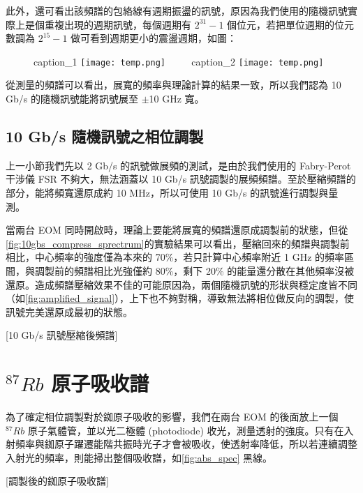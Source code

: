 \documentclass[class=NCU_thesis, crop=false]{standalone}
\begin{document}
此外，還可看出該頻譜的包絡線有週期振盪的訊號，原因為我們使用的隨機訊號實際上是個重複出現的週期訊號，每個週期有 $2^{31}-1$ 個位元，若把單位週期的位元數調為 $2^{15}-1$ 做可看到週期更小的震盪週期，如圖：

\begin{figure}[!hbt]
    \centering
    \subcaptionbox
        {caption\_1
        \label{fig:subfig_fig1}}
        {\texttt{[image: temp.png]}}
    ~~~~
    \subcaptionbox
        {caption\_2
        \label{fig:subfig_fig2}}
        {\texttt{[image: temp.png]}}
\end{figure}

從測量的頻譜可以看出，展寬的頻率與理論計算的結果一致，所以我們認為 10 Gb/s 的隨機訊號能將訊號展至 $\pm$10 GHz 寬。

\subsection{10 Gb/s 隨機訊號之相位調製}

上一小節我們先以 2 Gb/s 的訊號做展頻的測試，是由於我們使用的 Fabry-Perot 干涉儀 FSR 不夠大，無法涵蓋以 10 Gb/s 訊號調製的展頻頻譜。至於壓縮頻譜的部分，能將頻寬還原成約 10 MHz，所以可使用 10 Gb/s 的訊號進行調製與量測。

當兩台 EOM 同時開啟時，理論上要能將展寬的頻譜還原成調製前的狀態，但從\cref{fig:10gbs_compress_sprectrum}的實驗結果可以看出，壓縮回來的頻譜與調製前相比，中心頻率的強度僅為本來的 70\%，若只計算中心頻率附近 1 GHz 的頻率區間，與調製前的頻譜相比光強僅約 80\%，剩下 20\% 的能量還分散在其他頻率沒被還原。造成頻譜壓縮效果不佳的可能原因為，兩個隨機訊號的形狀與穩定度皆不同（如\cref{fig:amplified_signal}），上下也不夠對稱，導致無法將相位做反向的調製，使訊號完美還原成最初的狀態。

[10 Gb/s 訊號壓縮後頻譜]

\section{$^{87}Rb$ 原子吸收譜}

為了確定相位調製對於銣原子吸收的影響，我們在兩台 EOM 的後面放上一個 $^{87}Rb$ 原子氣體管，並以光二極體 (photodiode) 收光，測量透射的強度。只有在入射頻率與銣原子躍遷能階共振時光子才會被吸收，使透射率降低，所以若連續調整入射光的頻率，則能掃出整個吸收譜，如\cref{fig:abs_spec} 黑線。

[調製後的銣原子吸收譜]
\end{document}
